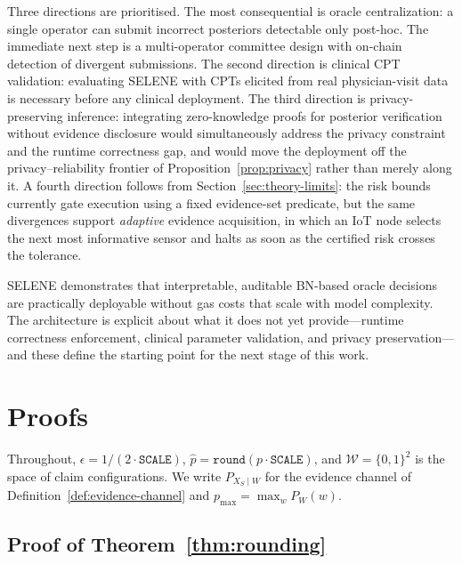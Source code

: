 \documentclass[journal]{IEEEtran}
\theoremstyle{definition}
\theoremstyle{remark}
\begin{document}
Three directions are prioritised. The most
consequential is oracle centralization: a single
operator can submit incorrect posteriors detectable
only post-hoc. The immediate next step is a
multi-operator committee design with on-chain
detection of divergent submissions. The second
direction is clinical CPT validation: evaluating SELENE
with CPTs elicited from real physician-visit data is
necessary before any clinical deployment. The third
direction is privacy-preserving inference: integrating
zero-knowledge proofs for posterior verification without
evidence disclosure would simultaneously address the
privacy constraint and the runtime correctness gap, and
would move the deployment off the
privacy--reliability frontier of
Proposition~\ref{prop:privacy} rather than merely along
it. A fourth direction follows from
Section~\ref{sec:theory-limits}: the risk bounds
currently gate execution using a fixed evidence-set
predicate, but the same divergences support
\emph{adaptive} evidence acquisition, in which an IoT node
selects the next most informative sensor and halts as soon
as the certified risk crosses the tolerance.

SELENE demonstrates that interpretable, auditable
BN-based oracle decisions are practically deployable
without gas costs that scale with model complexity.
The architecture is explicit about what it does not
yet provide---runtime correctness enforcement,
clinical parameter validation, and privacy
preservation---and these define the starting point
for the next stage of this work.



\appendices
\section{Proofs}
\label{app:proofs}

Throughout, $\epsilon=1/(2\cdot\texttt{SCALE})$,
$\widehat{p}=\texttt{round}(p\cdot\texttt{SCALE})$, and
$\mathcal{W}=\{0,1\}^2$ is the space of claim
configurations. We write $P_{X_S\mid W}$ for the evidence
channel of Definition~\ref{def:evidence-channel} and
$p_{\max}=\max_{w}P_W(w)$.

\subsection{Proof of Theorem~\ref{thm:rounding}}
\label{app:proof-rounding}
\end{document}
